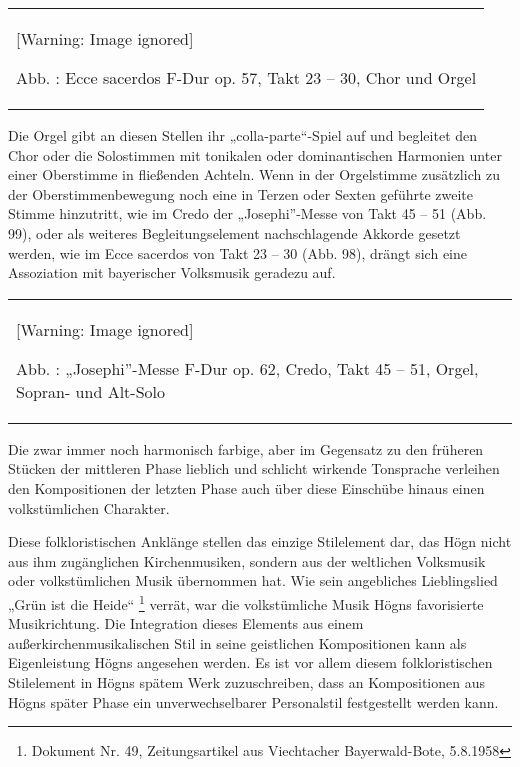 \documentclass[a4paper]{article}
\newcounter{Abb}
\renewcommand\theAbb{\arabic{Abb}}
\begin{document}
\begin{center}
\tablefirsthead{}
\tablehead{}
\tabletail{}
\tablelasttail{}
\begin{supertabular}{m{12.034cm}}
  [Warning: Image ignored] %
 
\label{bkm:Ref99948828}Abb. \stepcounter{Abb}{\theAbb}: Ecce sacerdos
F-Dur op. 57, Takt 23 – 30, Chor und Orgel\\
\end{supertabular}
\end{center}
Die Orgel gibt an diesen Stellen ihr „colla-parte“-Spiel auf und
begleitet den Chor \newline
oder die Solostimmen mit tonikalen oder dominantischen Harmonien unter
einer \newline
Oberstimme in fließenden Achteln. Wenn in der Orgelstimme zusätzlich zu
der \newline
Oberstimmenbewegung noch eine in Terzen oder Sexten geführte zweite
Stimme hinzutritt, wie im Credo der „Josephi”-Messe von Takt 45 – 51
(Abb. 99), oder als weiteres Begleitungselement nachschlagende Akkorde
gesetzt werden, wie im Ecce sacerdos von Takt 23 – 30 (Abb. 98), drängt
sich eine Assoziation mit bayerischer Volksmusik geradezu auf.

\begin{center}
\tablefirsthead{}
\tablehead{}
\tabletail{}
\tablelasttail{}
\begin{supertabular}{m{11.729cm}}
  [Warning: Image ignored] %
 
\label{bkm:Ref99948855}Abb. \stepcounter{Abb}{\theAbb}: „Josephi”-Messe
F-Dur op. 62, Credo, Takt 45 – 51, Orgel, Sopran- und Alt-Solo\\
\end{supertabular}
\end{center}
Die zwar immer noch harmonisch farbige, aber im Gegensatz zu den
früheren Stücken der mittleren Phase lieblich und schlicht wirkende
Tonsprache verleihen den Kompositionen der letzten Phase auch über
diese Einschübe hinaus einen volkstümlichen Charakter. 

Diese folkloristischen Anklänge stellen das einzige Stilelement dar, das
Högn nicht aus ihm zugänglichen Kirchenmusiken, sondern aus der
weltlichen Volksmusik oder volkstümlichen Musik übernommen hat. Wie
sein angebliches Lieblingslied „Grün ist die Heide“ \footnote{ Dokument
Nr. 49, Zeitungsartikel aus Viechtacher Bayerwald-Bote, 5.8.1958}
verrät, war die volkstümliche Musik Högns favorisierte Musikrichtung.
Die Integration dieses Elements aus einem außerkirchenmusikalischen
Stil in seine geistlichen Kompositionen kann als Eigenleistung Högns
angesehen werden. Es ist vor allem diesem folkloristischen Stilelement
in Högns spätem Werk zuzuschreiben, dass an Kompositionen aus Högns
später Phase ein unverwechselbarer Personalstil festgestellt werden
kann.
\end{document}
